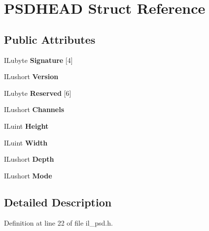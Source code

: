 \hypertarget{structPSDHEAD}{}\section{P\+S\+D\+H\+E\+AD Struct Reference}
\label{structPSDHEAD}
\subsection*{Public Attributes}
\begin{DoxyCompactItemize}
\item 
\mbox{\label{structPSDHEAD_a72f8356465adc06cb5f34fc0890467f3}} 
I\+Lubyte {\bfseries Signature} \mbox{[}4\mbox{]}
\item 
\mbox{\label{structPSDHEAD_a4df4bfadf77d503b4be25ce0152ad93c}} 
I\+Lushort {\bfseries Version}
\item 
\mbox{\label{structPSDHEAD_ab679fa9a77936357853c348948770b08}} 
I\+Lubyte {\bfseries Reserved} \mbox{[}6\mbox{]}
\item 
\mbox{\label{structPSDHEAD_a76549d623d017e9f3567d373cb753a10}} 
I\+Lushort {\bfseries Channels}
\item 
\mbox{\label{structPSDHEAD_ab9a697939bf92f5c7c47861f980043a3}} 
I\+Luint {\bfseries Height}
\item 
\mbox{\label{structPSDHEAD_ae3e87f8c79117e89e07b5f60f43677e0}} 
I\+Luint {\bfseries Width}
\item 
\mbox{\label{structPSDHEAD_a8a7fc9bff101b457a8ccedfd097f180e}} 
I\+Lushort {\bfseries Depth}
\item 
\mbox{\label{structPSDHEAD_af2c5095b08f7c49b4bbd00c02ff31d14}} 
I\+Lushort {\bfseries Mode}
\end{DoxyCompactItemize}


\subsection{Detailed Description}


Definition at line 22 of file il\+\_\+psd.\+h.




